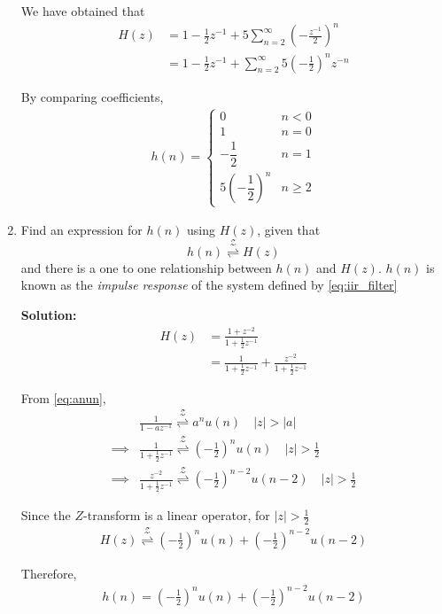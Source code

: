 \documentclass[journal,12pt,twocolumn]{IEEEtran}
\newcommand{\solution}{\noindent \textbf{Solution: }}
\providecommand{\brak}[1]{\ensuremath{\left(#1\right)}}
\providecommand{\abs}[1]{\left\vert#1\right\vert}
\providecommand{\ztrans}{\overset{\mathcal{Z}}{ \rightleftharpoons}}
\numberwithin{equation}{section}
\renewcommand\thesection{\arabic{section}}
\begin{document}
\begin{enumerate}[label=\thesection.\arabic*]
	We have obtained that
	\begin{align}
		H(z) &= 1 - \frac12 z^{-1} + 5\sum_{n=2}^\infty \brak{-\frac{z^{-1}}{2}}^n \\
		&= 1 - \frac12 z^{-1} + \sum_{n=2}^\infty 5\brak{-\frac{1}{2}}^n z^{-n}
	\end{align}
	
	By comparing coefficients,
	\begin{align}
		h(n) = 
		\begin{cases}
			0 & n < 0 \\
			1 & n = 0 \\
			-\dfrac{1}{2} & n = 1 \\
			5\brak{-\dfrac{1}{2}}^n & n \ge 2
		\end{cases}
 	\end{align}

	
	\item \label{prob:impulse_resp}
	Find an expression for $h(n)$ using $H(z)$, given that 
	\begin{equation}
		\label{eq:impulse_resp}
		h(n) \ztrans H(z)
	\end{equation}
	and there is a one to one relationship between $h(n)$ and $H(z)$. $h(n)$ is known as the {\em impulse response} of the system defined by \eqref{eq:iir_filter}
	
	\solution
	\begin{align}
		H(z) &= \frac{1 + z^{-2}}{1 + \frac12 z^{-1}} \\
		&= \frac{1}{1 + \frac12 z^{-1}} + \frac{z^{-2}}{1 + \frac12 z^{-1}}
	\end{align}
	
	From \eqref{eq:anun},
	\begin{align}
		&\frac{1}{1-az^{-1}} \ztrans a^nu(n)  \quad \abs{z} > \abs{a} \\
		\implies &\frac{1}{1 + \frac12 z^{-1}} \ztrans \brak{-\frac12}^n u(n) \quad \abs{z} > \frac12 \\
		\implies &\frac{z^{-2}}{1 + \frac12 z^{-1}} \ztrans \brak{-\frac12}^{n-2} u(n-2) \quad \abs{z} > \frac12
	\end{align}
	
	Since the $Z$-transform is a linear operator, for $\abs{z} > \frac12$
	\begin{align}
		H(z) \ztrans \brak{-\frac12}^n u(n) + \brak{-\frac12}^{n-2} u(n-2)
	\end{align}
	
	Therefore, 
	\begin{align}
		h(n) = \brak{-\frac12}^n u(n) + \brak{-\frac12}^{n-2} u(n-2)
	\end{align}
	

\end{enumerate}
\end{document}
